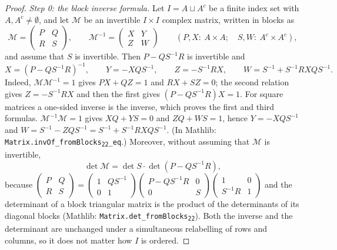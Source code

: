 \begin{proof}
\emph{Step 0: the block inverse formula.} Let $I=A\sqcup A^c$ be a finite index set with $A,A^c\ne\emptyset$, and let $\mathcal M$ be an invertible $I\times I$ complex matrix, written in blocks as
\[
 \mathcal M=\begin{pmatrix}P&Q\\R&S\end{pmatrix},\qquad\mathcal M^{-1}=\begin{pmatrix}X&Y\\Z&W\end{pmatrix}\qquad(P,X:\ A\times A;\quad S,W:\ A^c\times A^c),
\]
and assume that $S$ is invertible. Then $P-QS^{-1}R$ is invertible and
\begin{equation}\tag{BI}\label{eq:BI}
 X=(P-QS^{-1}R)^{-1},\qquad Y=-XQS^{-1},\qquad Z=-S^{-1}RX,\qquad W=S^{-1}+S^{-1}RXQS^{-1}.
\end{equation}
Indeed, $\mathcal M\mathcal M^{-1}=1$ gives $PX+QZ=1$ and $RX+SZ=0$; the second relation gives $Z=-S^{-1}RX$ and then the first gives $(P-QS^{-1}R)X=1$.
For square matrices a one-sided inverse is the inverse, which proves the first and third formulas. $\mathcal M^{-1}\mathcal M=1$ gives $XQ+YS=0$ and $ZQ+WS=1$, hence $Y=-XQS^{-1}$ and
$W=S^{-1}-ZQS^{-1}=S^{-1}+S^{-1}RXQS^{-1}$. (In Mathlib: \texttt{Matrix.invOf\_fromBlocks\textsubscript{22}\_eq}.)
Moreover, without assuming that $\mathcal M$ is invertible,
\begin{equation}\tag{BD}\label{eq:BD}
 \det\mathcal M=\det S\cdot\det(P-QS^{-1}R),
\end{equation}
because
$\begin{pmatrix}P&Q\\R&S\end{pmatrix}=\begin{pmatrix}1&QS^{-1}\\0&1\end{pmatrix}\begin{pmatrix}P-QS^{-1}R&0\\0&S\end{pmatrix}\begin{pmatrix}1&0\\S^{-1}R&1\end{pmatrix}$
and the determinant of a block triangular matrix is the product of the determinants of its diagonal blocks (Mathlib: \texttt{Matrix.det\_fromBlocks\textsubscript{22}}).
Both the inverse and the determinant are unchanged under a simultaneous relabelling of rows and columns, so it does not matter how $I$ is ordered.


\end{proof}

